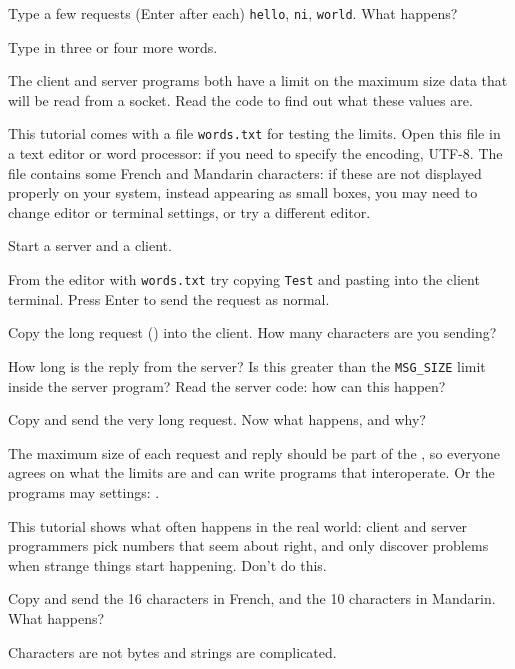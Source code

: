 Type a few requests (Enter after each) \texttt{hello}, \texttt{ni}, \texttt{world}.
What happens?

Type in three or four more words.



The client and server programs both have a limit on the maximum size data that
will be read from a socket. Read the code to find out what these values are.

This tutorial comes with a file \texttt{words.txt} for testing the limits. Open this
file in a text editor or word processor: if you need to specify the encoding, UTF-8.
The file contains some French and Mandarin characters: if these are not displayed
properly on your system, instead appearing as small boxes, you may need to change
editor or terminal settings, or try a different editor.

Start a server and a client.

From the editor with \texttt{words.txt} try copying \texttt{Test} and pasting into
the client terminal. Press Enter to send the request as normal.

\STEP Copy the long request () into the client. How many characters
are you sending?

How long is the reply from the server? Is this greater than the \texttt{MSG\_SIZE}
limit inside the server program? Read the server code: how can this happen?

\STEP Copy and send the very long request. Now what happens, and why?

\begin{IMPORTANT}
The maximum size of each request and reply should be part of the , so everyone agrees on what the limits are and can write programs that
interoperate. Or the programs may  settings:  .

This tutorial shows what often happens in the real world: client and server
programmers pick numbers that seem about right, and only discover problems when
strange things start happening. Don't do this.
\end{IMPORTANT}

\STEP Copy and send the 16 characters in French, and the 10 characters in Mandarin.
What happens?

\begin{IMPORTANT}
Characters are not bytes and strings are complicated.
\end{IMPORTANT}

